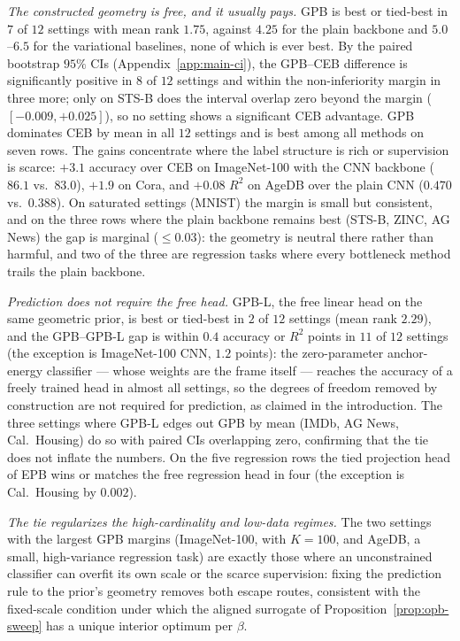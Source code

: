 \documentclass{article} %
\theoremstyle{plain}
\theoremstyle{remark}
\begin{document}
\emph{The constructed geometry is free, and it usually pays.} GPB is best or
tied-best in $7$ of $12$ settings with mean rank $1.75$, against $4.25$ for the plain
backbone and $5.0$--$6.5$ for the variational baselines, none of which is ever best.
By the paired bootstrap $95\%$ CIs (Appendix~\ref{app:main-ci}), the GPB--CEB
difference is significantly positive in $8$ of $12$ settings and within the
non-inferiority margin in three more; only on STS-B does the interval overlap zero
beyond the margin ($[-0.009, +0.025]$), so no setting shows a significant CEB
advantage. GPB dominates CEB by mean in all $12$ settings and is best among all
methods on seven rows.
The gains concentrate where the label structure is rich or supervision is scarce:
$+3.1$ accuracy over CEB on ImageNet-100 with the CNN backbone ($86.1$ vs.\ $83.0$),
$+1.9$ on Cora, and $+0.08$ $R^2$ on AgeDB over the plain CNN ($0.470$ vs.\ $0.388$).
On saturated settings (MNIST) the margin is small but consistent, and on the three
rows where the plain backbone remains best (STS-B, ZINC, AG News) the gap is
marginal ($\le 0.03$): the geometry is neutral there rather than harmful, and two
of the three are regression tasks where every bottleneck method trails the plain
backbone.

\emph{Prediction does not require the free head.} GPB-L, the free linear head on the
same geometric prior, is best or tied-best in $2$ of $12$ settings (mean rank
$2.29$), and the GPB--GPB-L gap is within $0.4$ accuracy or $R^2$ points in $11$ of
$12$ settings (the exception is ImageNet-100 CNN, $1.2$ points): the zero-parameter
anchor-energy classifier --- whose weights are the frame itself --- reaches the
accuracy of a freely trained head in almost all settings, so the degrees of freedom
removed by construction are not required for prediction, as claimed in the
introduction. The three settings where GPB-L edges out GPB by mean (IMDb, AG News,
Cal.\ Housing) do so with paired CIs overlapping zero, confirming that the tie
does not inflate the numbers. On the five
regression rows the tied projection head of EPB wins or matches the free
regression head in four (the exception is Cal.\ Housing by $0.002$).

\emph{The tie regularizes the high-cardinality and low-data regimes.} The two
settings with the largest GPB margins (ImageNet-100, with $K = 100$, and AgeDB, a
small, high-variance regression task) are exactly those where an unconstrained
classifier can overfit its own scale or the scarce supervision: fixing the
prediction rule to the prior's geometry removes both escape routes, consistent with
the fixed-scale condition under which the aligned surrogate of
Proposition~\ref{prop:opb-sweep} has a unique interior optimum per $\beta$.
\end{document}

